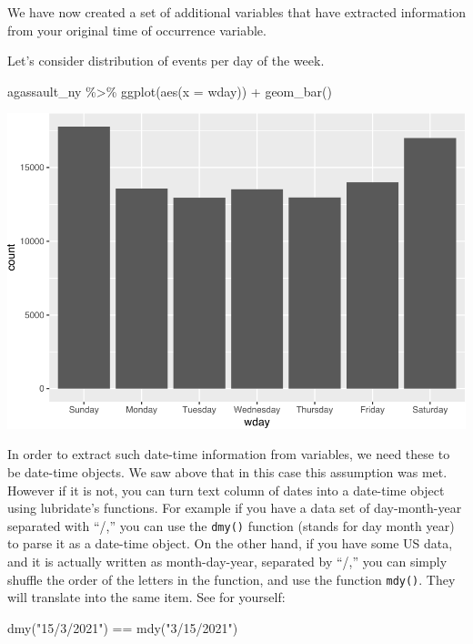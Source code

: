 \documentclass[
]{book}
\newenvironment{Shaded}{\begin{snugshade}}{\end{snugshade}}
\newcommand{\AttributeTok}[1]{\textcolor[rgb]{0.77,0.63,0.00}{#1}}
\newcommand{\FunctionTok}[1]{\textcolor[rgb]{0.00,0.00,0.00}{#1}}
\newcommand{\NormalTok}[1]{#1}
\newcommand{\SpecialCharTok}[1]{\textcolor[rgb]{0.00,0.00,0.00}{#1}}
\newcommand{\StringTok}[1]{\textcolor[rgb]{0.31,0.60,0.02}{#1}}
\begin{document}
We have now created a set of additional variables that have extracted information from your original time of occurrence variable.

Let's consider distribution of events per day of the week.

\begin{Shaded}
\begin{Highlighting}[]
\NormalTok{agassault\_ny }\SpecialCharTok{\%\textgreater{}\%} 
  \FunctionTok{ggplot}\NormalTok{(}\FunctionTok{aes}\NormalTok{(}\AttributeTok{x =}\NormalTok{ wday)) }\SpecialCharTok{+}
    \FunctionTok{geom\_bar}\NormalTok{()}
\end{Highlighting}
\end{Shaded}

\includegraphics{crime_mapping_files/figure-latex/assaults_per_wday-1.pdf}

In order to extract such date-time information from variables, we need these to be date-time objects. We saw above that in this case this assumption was met. However if it is not, you can turn text column of dates into a date-time object using lubridate's functions. For example if you have a data set of day-month-year separated with ``/,'' you can use the \texttt{dmy()} function (stands for day month year) to parse it as a date-time object. On the other hand, if you have some US data, and it is actually written as month-day-year, separated by ``/,'' you can simply shuffle the order of the letters in the function, and use the function \texttt{mdy()}. They will translate into the same item. See for yourself:

\begin{Shaded}
\begin{Highlighting}[]
\FunctionTok{dmy}\NormalTok{(}\StringTok{"15/3/2021"}\NormalTok{) }\SpecialCharTok{==} \FunctionTok{mdy}\NormalTok{(}\StringTok{"3/15/2021"}\NormalTok{)}
\end{Highlighting}
\end{Shaded}
\end{document}

